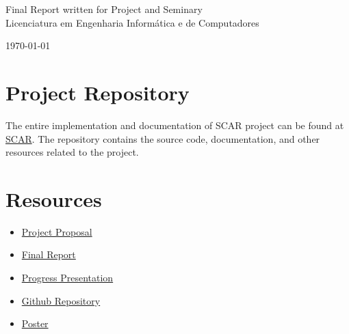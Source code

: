 \documentclass[10pt]{report}
\begin{document}
\begin{center}
\begin{large}
        \vspace{1.25cm}

        \begin{Large}
            Final Report written for Project and Seminary \\ \vspace{.25cm}
            Licenciatura em Engenharia Informática e de Computadores
        \end{Large}
    \end{large}

    \vspace{1.75cm} \today \vspace{.75cm}

\end{center}

\section{Project Repository}
The entire implementation and documentation of SCAR project can be found at \href{https://github.com/DiGo-Certify/DiGo-certify-app}{SCAR}.
The repository contains the source code, documentation, and other resources related to the project.

\section{Resources}
\begin{itemize}
    \item \href{https://github.com/DiGo-Certify/DiGo-certify-app/blob/main/docs/project-proposal/project-proposal.pdf}{Project Proposal}
    \item \href{https://github.com/DiGo-Certify/DiGo-certify-app/blob/main/docs/final-report/report.pdf}{Final Report}
    \item \href{URL}{Progress Presentation}
    \item \href{https://github.com/DiGo-Certify/DiGo-certify-app}{Github Repository}
    \item \href{https://github.com/DiGo-Certify/DiGo-certify-app/blob/main/docs/poster.pdf}{Poster}
\end{itemize}


\vspace{.75cm}



\end{document}
